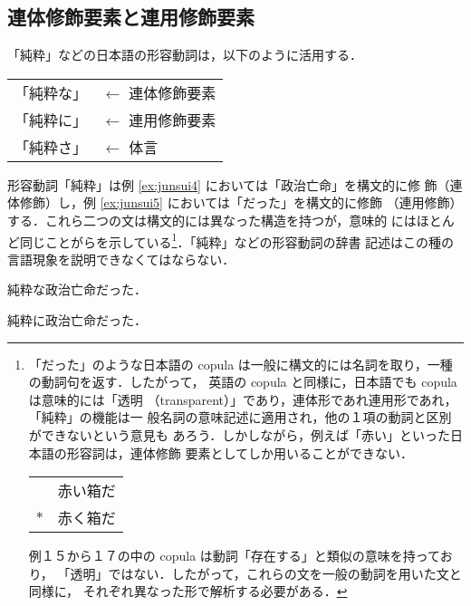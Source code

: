 \subsection{連体修飾要素と連用修飾要素}
\label{sec:Adnominal_Constituents_and_Adverbal_Constituents}

「純粋」などの日本語の形容動詞は，以下のように活用する． 

\begin{center}
  \begin{tabular}[c]{ll}
    「純粋な」 & $\longleftarrow$ 連体修飾要素\\
    「純粋に」 & $\longleftarrow$ 連用修飾要素\\
    「純粋さ」 & $\longleftarrow$ 体言
  \end{tabular}
\end{center}

形容動詞「純粋」は例 \ref{ex:junsui4} においては「政治亡命」を構文的に修
飾（連体修飾）し，例 \ref{ex:junsui5} においては「だった」を構文的に修飾
（連用修飾）する．これら二つの文は構文的には異なった構造を持つが，意味的 
にはほとんど同じことがらを示している\footnote{「だった」のような日本語の 
  copula は一般に構文的には名詞を取り，一種の動詞句を返す．したがって，
  英語の copula と同様に，日本語でも copula は意味的には「透明
  （transparent）」であり，連体形であれ連用形であれ，「純粋」の機能は一
  般名詞の意味記述に適用され，他の１項の動詞と区別ができないという意見も
  あろう．しかしながら，例えば「赤い」といった日本語の形容詞は，連体修飾
  要素としてしか用いることができない． 

  \begin{tabular}[c]{r@{}l}
    & 赤い箱だ\\
    $*$ & 赤く箱だ\\ 
  \end{tabular}

\vspace*{2mm}

例１５から１７の中の copula は動詞「存在する」と類似の意味を持っており，
「透明」ではない．したがって，これらの文を一般の動詞を用いた文と同様に，
それぞれ異なった形で解析する必要がある．}．「純粋」などの形容動詞の辞書
記述はこの種の言語現象を説明できなくてはならない．

\begin{exx}\rm
  \label{ex:junsui4}
  \hspace*{.5cm} 純粋な政治亡命だった．
\end{exx}

\begin{exx}\rm
  \label{ex:junsui5}
  \hspace*{.5cm} 純粋に政治亡命だった．
\end{exx}

